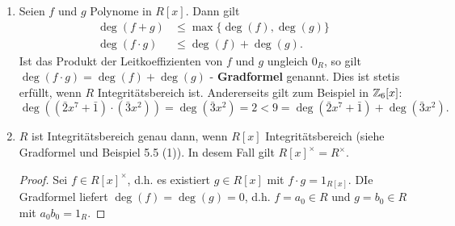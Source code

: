 \begin{rem}\label{rem5_9}
	\begin{enumerate}[label=(\roman*)]
		\item Seien $f$ und $g$ Polynome in $R[x]$. Dann gilt
		\begin{align*}
			\deg(f + g) &\leq \max\{\deg(f), \deg(g)\}\\
			\deg(f\cdot g) &\leq \deg(f) + \deg(g).
		\end{align*}
		Ist das Produkt der Leitkoeffizienten von $f$ und $g$ ungleich $0_R$, so gilt $\deg(f\cdot g) = \deg(f) + \deg(g)$ - \textbf{Gradformel} genannt.
		Dies ist stetis erfüllt, wenn $R$ Integritätsbereich ist. Andererseits gilt zum Beispiel in $\mathbb{Z}_6 [x]$:
		\[\deg((\bar{2}x^7 + \bar{1})\cdot(\bar{3}x^2)) = \deg(\bar{3}x^2) = 2 < 9 = \deg(\bar{2}x^7 + \bar{1}) + \deg(\bar{3}x^2).\]
		\item $R$ ist Integritätsbereich genau dann, wenn $R[x]$ Integritätsbereich (siehe Gradformel und Beispiel 5.5 (1)). In desem Fall gilt $R[x]^\times = R^\times$.
		\begin{proof}
			Sei $f \in R[x]^\times$, d.h. es existiert $g \in R[x]$ mit $f \cdot g = 1_{R[x]}$. DIe Gradformel liefert $\deg(f) = \deg(g) = 0$, d.h. $f = a_0 \in R$ und $g = b_0 \in R$ mit $a_0 b_0 = 1_R$.
		\end{proof} 
	\end{enumerate}
\end{rem}

